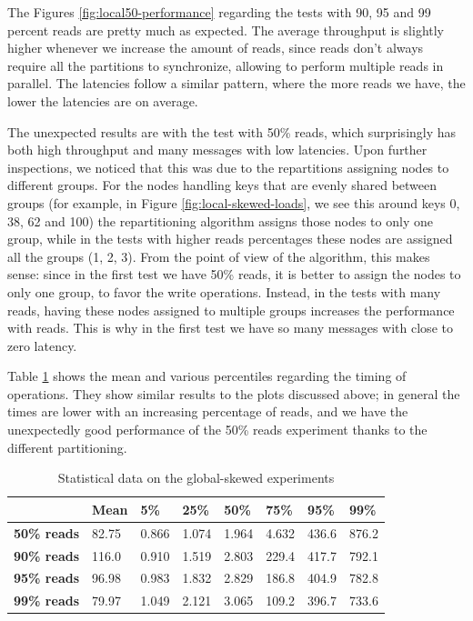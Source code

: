 The Figures \ref{fig:local50-performance} regarding the tests with 90, 95 and 99 percent reads are pretty much as expected. The average throughput is slightly higher whenever we increase the amount of reads, since reads don't always require all the partitions to synchronize, allowing to perform multiple reads in parallel. The latencies follow a similar pattern, where the more reads we have, the lower the latencies are on average.

The unexpected results are with the test with 50\% reads, which surprisingly has both high throughput and many messages with low latencies. Upon further inspections, we noticed that this was due to the repartitions assigning nodes to different groups. For the nodes handling keys that are evenly shared between groups (for example, in Figure \ref{fig:local-skewed-loads}, we see this around keys 0, 38, 62 and 100) the repartitioning algorithm assigns those nodes to only one group, while in the tests with higher reads percentages these nodes are assigned all the groups (1, 2, 3). From the point of view of the algorithm, this makes sense: since in the first test we have 50\% reads, it is better to assign the nodes to only one group, to favor the write operations. Instead, in the tests with many reads, having these nodes assigned to multiple groups increases the performance with reads. This is why in the first test we have so many messages with close to zero latency.

Table \ref{tab:local-latencies-table} shows the mean and various percentiles regarding the timing of operations. They show similar results to the plots discussed above; in general the times are lower with an increasing percentage of reads, and we have the unexpectedly good performance of the 50\% reads experiment thanks to the different partitioning.

\begin{table}[!htb]
  \centering
  \begin{tabular}{l l l l l l l l}
    \hline
    & \textbf{Mean} & \textbf{5\%} & \textbf{25\%} & \textbf{50\%} & \textbf{75\%} & \textbf{95\%}& \textbf{99\%} \\
    \hline
    \textbf{50\% reads} & 82.75 & 0.866 & 1.074 & 1.964 & 4.632 & 436.6 & 876.2 \\
    \textbf{90\% reads} & 116.0 & 0.910 & 1.519 & 2.803 & 229.4 & 417.7 & 792.1 \\
    \textbf{95\% reads} & 96.98 & 0.983 & 1.832 & 2.829 & 186.8 & 404.9 & 782.8 \\
    \textbf{99\% reads} & 79.97 & 1.049 & 2.121 & 3.065 & 109.2 & 396.7 &  733.6 \\
    \hline
  \end{tabular}
  \caption{Statistical data on the global-skewed experiments}\label{tab:local-latencies-table}
\end{table}

